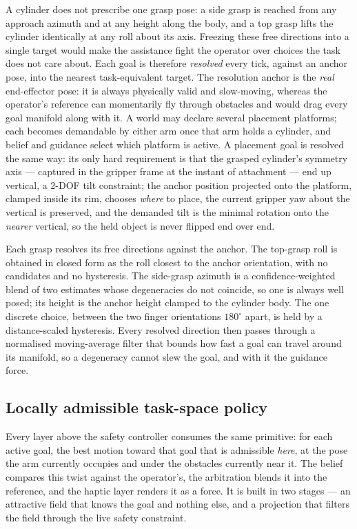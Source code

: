 \documentclass[12pt,a4paper,twoside,openright]{report}
\begin{document}
A cylinder does not prescribe one grasp pose: a side grasp is reached from any approach azimuth and at any height along the body, and a top grasp lifts the cylinder identically at any roll about its axis. Freezing these free directions into a single target would make the assistance fight the operator over choices the task does not care about. Each goal is therefore \emph{resolved} every tick, against an anchor pose, into the nearest task-equivalent target. The resolution anchor is the \emph{real} end-effector pose: it is always physically valid and slow-moving, whereas the operator's reference can momentarily fly through obstacles and would drag every goal manifold along with it. A world may declare several placement platforms; each becomes demandable by either arm once that arm holds a cylinder, and belief and guidance select which platform is active. A placement goal is resolved the same way: its only hard requirement is that the grasped cylinder's symmetry axis --- captured in the gripper frame at the instant of attachment --- end up vertical, a 2-DOF tilt constraint; the anchor position projected onto the platform, clamped inside its rim, chooses \emph{where} to place, the current gripper yaw about the vertical is preserved, and the demanded tilt is the minimal rotation onto the \emph{nearer} vertical, so the held object is never flipped end over end.

Each grasp resolves its free directions against the anchor. The top-grasp roll is obtained in closed form as the roll closest to the anchor orientation, with no candidates and no hysteresis. The side-grasp azimuth is a confidence-weighted blend of two estimates whose degeneracies do not coincide, so one is always well posed; its height is the anchor height clamped to the cylinder body. The one discrete choice, between the two finger orientations $180^{\circ}$ apart, is held by a distance-scaled hysteresis. Every resolved direction then passes through a normalised moving-average filter that bounds how fast a goal can travel around its manifold, so a degeneracy cannot slew the goal, and with it the guidance force.

\subsection{Locally admissible task-space policy}
\label{sec:localpolicy}

Every layer above the safety controller consumes the same primitive: for each active goal, the best motion toward that goal that is admissible \emph{here}, at the pose the arm currently occupies and under the obstacles currently near it. The belief compares this twist against the operator's, the arbitration blends it into the reference, and the haptic layer renders it as a force. It is built in two stages --- an attractive field that knows the goal and nothing else, and a projection that filters the field through the live safety constraint.
\end{document}
